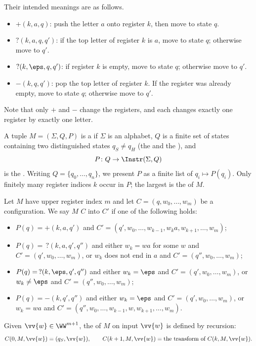 Their intended meanings are as follows.
\begin{itemize}
	\item $+(k,a,q)$: push the letter $a$ onto register $k$, then move to state $q$.
	\item $?(k,a,q,q')$: if the top letter of register $k$ is $a$, move to state $q$; otherwise move to $q'$.
	\item $?(k,\eps,q,q')$: if register $k$ is empty, move to state $q$; otherwise move to $q'$.
	\item $-(k,q,q')$: pop the top letter of register $k$. If the register was already empty, move to state $q$; otherwise move to $q'$.
\end{itemize}
Note that only $+$ and $-$ change the registers, and each changes exactly one register by exactly one letter.

\begin{definition}
	A tuple $M = (\Sigma, Q, P)$ is a  if $\Sigma$ is an alphabet, $Q$ is a finite set of states containing two distinguished states $q_S \neq q_H$ (the  and the ), and
	$$P \colon Q \to \Instr(\Sigma, Q)$$
	is the . Writing $Q = \{q_0, \dots, q_n\}$, we present $P$ as a finite list of  $q_i \mapsto P(q_i)$. Only finitely many register indices $k$ occur in $P$; the largest is the  of $M$.
\end{definition}

\begin{definition}[Computation]
	Let $M$ have upper register index $m$ and let $C = (q, w_0, \dots, w_m)$ be a configuration. We say $M$  $C$ into $C'$ if one of the following holds:
	\begin{itemize}
		\item $P(q) = +(k,a,q')$ and $C' = (q', w_0, \dots, w_{k-1}, w_ka, w_{k+1}, \dots, w_m)$;
		\item $P(q) = \,?(k,a,q',q'')$ and either $w_k = wa$ for some $w$ and $C' = (q', w_0,\dots,w_m)$, or $w_k$ does not end in $a$ and $C' = (q'', w_0,\dots,w_m)$;
		\item $P(q) = \,?(k,\eps,q',q'')$ and either $w_k = \eps$ and $C' = (q', w_0,\dots,w_m)$, or $w_k \neq \eps$ and $C' = (q'',w_0,\dots,w_m)$;
		\item $P(q) = -(k,q',q'')$ and either $w_k = \eps$ and $C' = (q', w_0,\dots,w_m)$, or $w_k = wa$ and $C' = (q'', w_0,\dots,w_{k-1},w,w_{k+1},\dots,w_m)$.
	\end{itemize}
	Given $\vv{w} \in \WW^{m+1}$, the  of $M$ on input $\vv{w}$ is defined by recursion:
	$$C(0,M,\vv{w}) = (q_S, \vv{w}), \qquad C(k+1,M,\vv{w}) = \text{the transform of } C(k,M,\vv{w}).$$
\end{definition}

